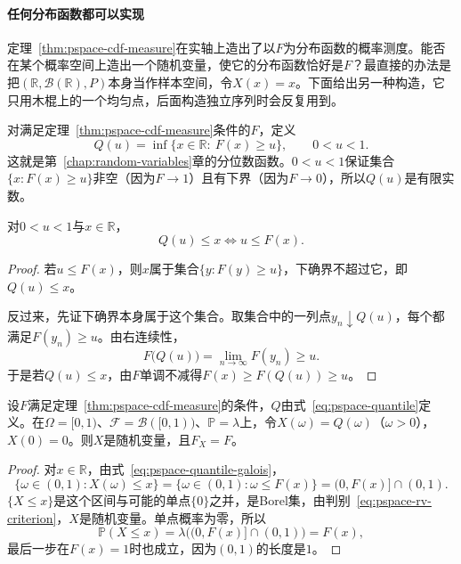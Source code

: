 \paragraph{任何分布函数都可以实现}
定理~\ref{thm:pspace-cdf-measure}在实轴上造出了以$F$为分布函数的概率测度。能否在某个概率空间上造出一个随机变量，使它的分布函数恰好是$F$？最直接的办法是把$(\mathbb{R},\mathcal{B}(\mathbb{R}),P)$本身当作样本空间，令$X(x)=x$。下面给出另一种构造，它只用木棍上的一个均匀点，后面构造独立序列时会反复用到。

对满足定理~\ref{thm:pspace-cdf-measure}条件的$F$，定义
\begin{equation}
  Q(u)=\inf\{x\in\mathbb{R}:\ F(x)\geq u\},\qquad 0<u<1 .
  \label{eq:pspace-quantile}
\end{equation}
这就是第~\ref{chap:random-variables}章的分位数函数。$0<u<1$保证集合$\{x:F(x)\geq u\}$非空（因为$F\to1$）且有下界（因为$F\to0$），所以$Q(u)$是有限实数。

\begin{lemma}[分位数函数的基本关系]
\label{lem:pspace-quantile}
对$0<u<1$与$x\in\mathbb{R}$，
\begin{equation}
  Q(u)\leq x\iff u\leq F(x).
  \label{eq:pspace-quantile-galois}
\end{equation}
\end{lemma}

\begin{proof}
若$u\leq F(x)$，则$x$属于集合$\{y:F(y)\geq u\}$，下确界不超过它，即$Q(u)\leq x$。

反过来，先证下确界本身属于这个集合。取集合中的一列点$y_n\downarrow Q(u)$，每个都满足$F(y_n)\geq u$。由右连续性，
\[
  F\bigl(Q(u)\bigr)=\lim_{n\to\infty}F(y_n)\geq u .
\]
于是若$Q(u)\leq x$，由$F$单调不减得$F(x)\geq F(Q(u))\geq u$。
\end{proof}

\begin{theorem}[分位数变换]
\label{thm:pspace-quantile-transform}
设$F$满足定理~\ref{thm:pspace-cdf-measure}的条件，$Q$由式~\eqref{eq:pspace-quantile}定义。在$\Omega=[0,1)$、$\mathcal{F}=\mathcal{B}([0,1))$、$\mathbb{P}=\lambda$上，令$X(\omega)=Q(\omega)$（$\omega>0$），$X(0)=0$。则$X$是随机变量，且$F_X=F$。
\end{theorem}

\begin{proof}
对$x\in\mathbb{R}$，由式~\eqref{eq:pspace-quantile-galois}，
\[
  \{\omega\in(0,1):X(\omega)\leq x\}=\{\omega\in(0,1):\omega\leq F(x)\}=(0,F(x)]\cap(0,1).
\]
$\{X\leq x\}$是这个区间与可能的单点$\{0\}$之并，是Borel集，由判别~\eqref{eq:pspace-rv-criterion}，$X$是随机变量。单点概率为零，所以
\[
  \mathbb{P}(X\leq x)=\lambda\bigl((0,F(x)]\cap(0,1)\bigr)=F(x),
\]
最后一步在$F(x)=1$时也成立，因为$(0,1)$的长度是$1$。
\end{proof}


